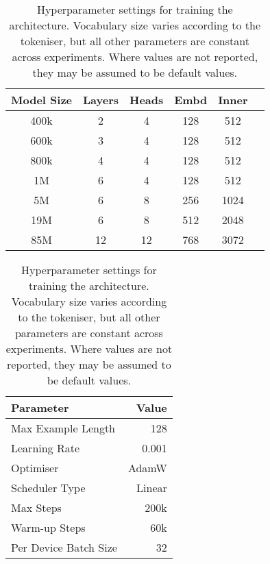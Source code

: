 \begin{table}[t]
    \begin{minipage}{.5\linewidth}
        \centering
        \small
        \begin{tabular}{cccccc}
            \toprule
            Model Size & Layers & Heads & Embd & Inner \\
            \midrule
            400k & 2 & 4 & 128 & 512 \\ 
            600k & 3 & 4 & 128 & 512 \\ 
            800k & 4 & 4 & 128 & 512 \\ 
            1M & 6 & 4 & 128 & 512 \\ 
            5M & 6 & 8 & 256 & 1024 \\ 
            19M & 6 & 8 & 512 & 2048 \\ 
            85M & 12 & 12 & 768 & 3072 \\ 
            \bottomrule
        \end{tabular}
        \caption{Parameters for \gpt model of varying sizes. Where values are not reported, they may be assumed to be default values.}
        \label{tab:14-model_sizes}
    \end{minipage}
    \hfill
    \begin{minipage}{.5\linewidth}
        \centering
        \small
        \begin{tabular}{lr}
            \toprule
            Parameter & Value \\
            \midrule
            Max Example Length & 128 \\
            Learning Rate & 0.001\\
            Optimiser & AdamW \\
            Scheduler Type & Linear\\
            Max Steps & 200k \\
            Warm-up Steps & 60k \\
            Per Device Batch Size & 32 \\
            \bottomrule
        \end{tabular}
        \caption{Hyperparameter settings for training the \gpt architecture. Vocabulary size varies according to the tokeniser, but all other parameters are constant across experiments. Where values are not reported, they may be assumed to be default values.}
        \label{tab:14-trainingparams}
    \end{minipage}
\end{table}

